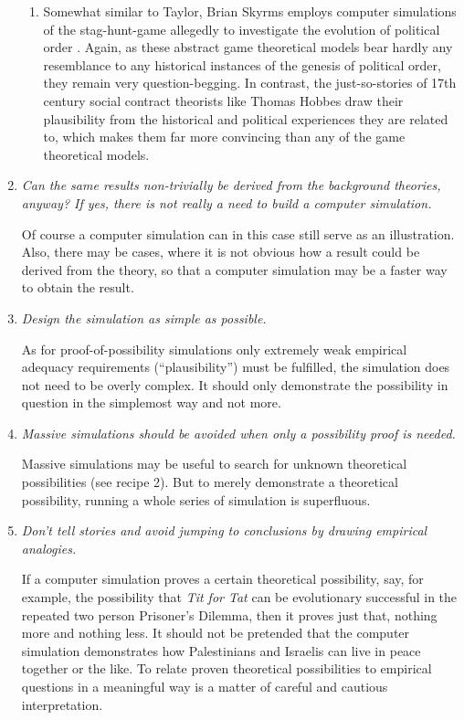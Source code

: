 \begin{enumerate}
\begin{enumerate}
\item Somewhat similar to Taylor, Brian Skyrms employs computer simulations of
  the stag-hunt-game allegedly to investigate the evolution of political
  order \cite[]{skyrms:2004}.  Again, as these abstract game theoretical models
bear hardly any resemblance to any historical instances of the genesis of
political order, they remain very question-begging. In contrast, the
just-so-stories of 17th century social contract theorists like Thomas Hobbes
draw their plausibility from the historical and political experiences they are
related to, which makes them far more convincing than any of the game
theoretical models.

\end{enumerate}

\item {\em Can the same results non-trivially be derived from the background
    theories, anyway? If yes, there is not really a need to build a computer
    simulation.}

  Of course a computer simulation can in this case still serve as an
  illustration. Also, there may be cases, where it is not obvious how a result
  could be derived from the theory, so that a computer simulation may be a
  faster way to obtain the result.

\item {\em Design the simulation as simple as possible.}

  As for proof-of-possibility simulations only extremely weak empirical
  adequacy requirements (``plausibility'') must be fulfilled, the simulation does
  not need to be overly complex. It should only demonstrate the possibility in
  question in the simplemost way and not more.

\item {\em Massive simulations should be avoided when only a possibility proof
    is needed.}

  Massive simulations may be useful to search for unknown theoretical
  possibilities (see recipe 2). But to merely demonstrate a theoretical
  possibility, running a whole series of simulation is superfluous.

\item {\em Don't tell stories and avoid jumping to conclusions by drawing
    empirical analogies.}

  If a computer simulation proves a certain theoretical possibility, say, for
  example, the possibility that {\em Tit for Tat} can be evolutionary
  successful in the repeated two person Prisoner's Dilemma, then it proves
  just that, nothing more and nothing less.  It should not be pretended that
  the computer simulation demonstrates how Palestinians and Israelis can live
  in peace together or the like. To relate proven theoretical possibilities to
  empirical questions in a meaningful way is a matter of careful and cautious
  interpretation.

\end{enumerate}


